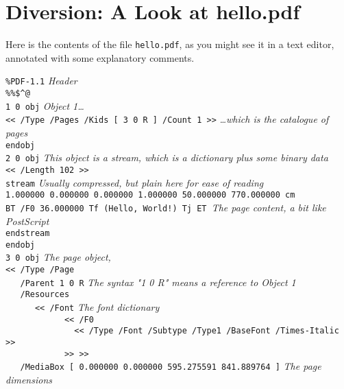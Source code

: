 \documentclass[a4paper]{memoir}
\begin{document}
\section*{Diversion: A Look at hello.pdf}
Here is the contents of the file \texttt{hello.pdf}, as you might see it in a text editor, annotated with some explanatory comments.
\begin{framed}
\noindent\small\verb!%PDF-1.1! \textit{Header}\\
\noindent\small\verb!%%$^@!\\
\noindent\small\verb!1 0 obj! \textit{Object 1\ldots}\\
\noindent\small\verb!<< /Type /Pages /Kids [ 3 0 R ] /Count 1 >>! \textit{\ldots which is the catalogue of pages}\\
\noindent\small\verb!endobj!\\
\noindent\small\verb!2 0 obj! \textit{This object is a stream, which is a dictionary plus some binary data}\\
\noindent\small\verb!<< /Length 102 >>!\\
\noindent\small\verb!stream! \textit{Usually compressed, but plain here for ease of reading}\\
\noindent\small\verb!1.000000 0.000000 0.000000 1.000000 50.000000 770.000000 cm!\\
\noindent\small\verb$BT /F0 36.000000 Tf (Hello, World!) Tj ET $\textit{The page content, a bit like PostScript}\\
\noindent\small\verb!endstream!\\
\noindent\small\verb!endobj!\\
\noindent\small\verb!3 0 obj! \textit{The page object, }\\
\noindent\small\verb!<< /Type /Page!\\
\noindent\small\verb!   /Parent 1 0 R! \textit{The syntax "1 0 R" means a reference to Object 1}\\ 
\noindent\small\verb!   /Resources!\\
\noindent\small\verb!      << /Font! \textit{The font dictionary}\\
\noindent\small\verb!            << /F0!\\
\noindent\small\verb!              << /Type /Font /Subtype /Type1 /BaseFont /Times-Italic >>!\\
\noindent\small\verb!            >> >>!\\
\noindent\small\verb!   /MediaBox [ 0.000000 0.000000 595.275591 841.889764 ]! \textit{The page dimensions}\\

\end{framed}
\end{document}
